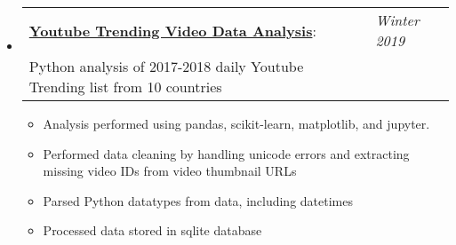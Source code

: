 \documentclass[letterpaper,11pt]{article}
\makeatletter
\newcommand{\resitem}[1]{\item #1 \vspace{-2pt}}
\newcommand{\projectheading}[3]{
\begin{tabular*}{6.5in}{l@{\extracolsep{\fill}}l}
\textbf{#1}: & \textit{#3}\\
\footnotesize{#2} 
\end{tabular*}
\vspace{-6pt}
}
\makeatother
\begin{document}
    \begin{itemize}[leftmargin=*]
    \item[]{
            \projectheading{\href{https://github.com/slogsdon7/csc4760_project/}{Youtube Trending Video Data Analysis}}{Python analysis of 2017-2018 daily Youtube Trending list from 10 countries}{Winter 2019}
            \footnotesize{
            \begin{itemize}
                \resitem{Analysis performed using pandas, scikit-learn, matplotlib, and jupyter.}
                \resitem{Performed data cleaning by handling unicode errors and extracting missing video IDs from video thumbnail URLs}
                \resitem{Parsed Python datatypes from data, including datetimes}
                \resitem{Processed data stored in sqlite database}
            \end{itemize}
            }
    }
        \begin{comment}\item[]{
        \projectheading{\href{https://github.com/slogsdon7/spinitron}{PySpinitron}}{Pythonic wrapper for Spinitron's REST HTTP API}{Spring 2019}
         \footnotesize{
         \begin{itemize}
             \resitem {Spinitron is a playlist logging and management service for noncommercial radio stations}
             \resitem {Highly configurable - can be used with custom HTTP client for caching and rate-limiting}
         \end{itemize}
        }
        }
        \end{comment}


\end{itemize}
\end{document}
